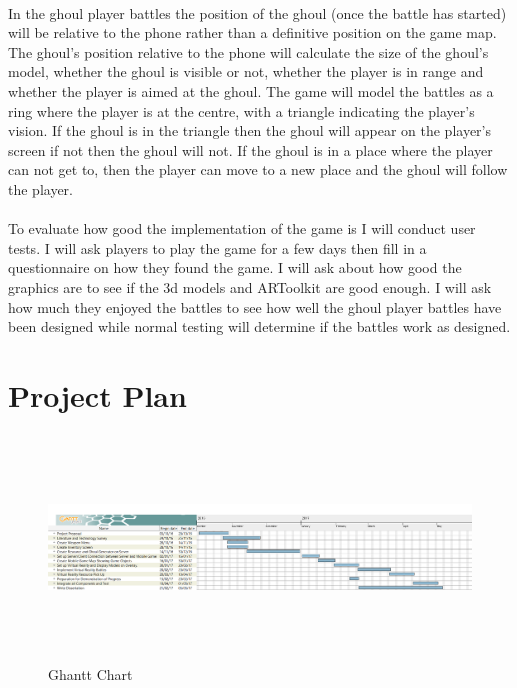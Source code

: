 \documentclass{article}
\begin{document}
		\paragraph{}In the ghoul player battles the position of the ghoul (once the battle has started) will be relative to the phone rather than a definitive position on the game map. The ghoul's position relative to the phone will calculate the size of the ghoul's model, whether the ghoul is visible or not, whether the player is in range and whether the player is aimed at the ghoul. The game will model the battles as a ring where the player is at the centre, with a triangle indicating the player's vision. If the ghoul is in the triangle then the ghoul will appear on the player's screen if not then the ghoul will not. If the ghoul is in a place where the player can not get to, then the player can move to a new place and the ghoul will follow the player.
		
		\paragraph{}To evaluate how good the implementation of the game is I will conduct user tests. I will ask players to play the game for a few days then fill in a questionnaire on how they found the game. I will ask about how good the graphics are to see if the 3d models and ARToolkit are good enough. I will ask how much they enjoyed the battles to see how well the ghoul player battles have been designed while normal testing will determine if the battles work as designed. 
		
		
		
		\section{Project Plan}
		\begin{figure}[h]
			\includegraphics[width=150mm,height=60mm]{ProjectGanttChart.png}
			\caption{Ghantt Chart}
		\end{figure}
		
\end{document}
